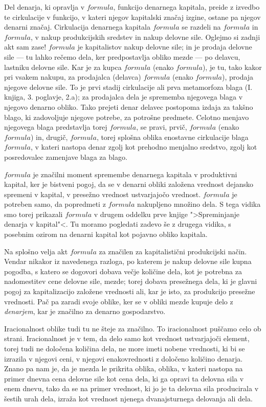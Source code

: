 \documentclass[a5paper]{scrbook}
\begin{document}
Del denarja, ki opravlja v \( formula \), funkcijo denarnega kapitala, preide z izvedbo te cirkulacije v funkcijo, v kateri njegov kapitalski značaj izgine, ostane pa njegov denarni značaj. Cirkulacija denarnega kapitala \( formula \) se razdeli na \( formula \) in \( formula \), v nakup produkcijskih sredstev in nakup delovne sile. Oglejmo si zadnji akt sam zase! \( formula \) je kapitalistov nakup delovne sile; in je prodaja delovne sile --- tu lahko rečemo dela, ker predpostavlja obliko mezde --- po delavcu, lastniku delovne sile. Kar je za kupca \( formula \) (enako \( formula \)), je tu, tako kakor pri vsakem nakupu, za prodajalca (delavca) \( formula \) (enako \( formula \)), prodaja njegove delovne sile. To je prvi stadij cirkulacije ali prva metamorfoza blaga (I. knjiga, 3. poglavje, 2.a); za prodajalca dela je sprememba njegovega blaga v njegovo denarno obliko. Tako prejeti denar delavec postopoma izdaja za takšno blago, ki zadovoljuje njegove potrebe, za potrošne predmete. Celotno menjavo njegovega blaga predstavlja torej \( formula \), se pravi, prvič, \( formula \) (enako \( formula \)) in, drugič, \( formula \), torej splošna oblika enostavne cirkulacije blaga \( formula \), v kateri nastopa denar zgolj kot prehodno menjalno sredstvo, zgolj kot posredovalec zamenjave blaga za blago.

\( formula \) je značilni moment spremembe denarnega kapitala v produktivni kapital, ker je bistveni pogoj, da se v denarni obliki založena vrednost dejansko spremeni v kapital, v presežno vrednost ustvarjajočo vrednost. \( formula \) je potreben samo, da popredmeti z \( formula \) nakupljeno množino dela. S tega vidika smo torej prikazali \( formula \) v drugem oddelku prve knjige ">Spreminjanje denarja v kapital"<. Tu moramo pogledati zadevo še z drugega vidika, s posebnim ozirom na denarni kapital kot pojavno obliko kapitala.

Na splošno velja akt \( formula \) za značilen za kapitalistični produkcijski način. Vendar nikakor iz navedenega razloga, po katerem je nakup delovne sile kupna pogodba, s katero se dogovori dobava večje količine dela, kot je potrebna za nadomestitev cene delovne sile, mezde; torej dobava presežnega dela, ki je glavni pogoj za kapitalizacijo založene vrednosti ali, kar je isto, za produkcijo presežne vrednosti. Pač pa zaradi svoje oblike, ker se v obliki mezde kupuje delo z \emph{denarjem}, kar je značilno za denarno gospodarstvo.

Iracionalnost oblike tudi tu ne šteje za značilno. To iracionalnost puščamo celo ob strani. Iracionalnost je v tem, da delo samo kot vrednost ustvarjajoči element, torej tudi ne določena količina dela, ne more imeti nobene vrednosti, ki bi se izrazila v njegovi ceni, v njegovi enakovrednosti z določeno količino denarja. Znano pa nam je, da je mezda le prikrita oblika, oblika, v kateri nastopa na primer dnevna cena delovne sile kot cena dela, ki ga opravi ta delovna sila v enem dnevu, tako da se na primer vrednost, ki jo je ta delovna sila producirala v šestih urah dela, izraža kot vrednost njenega dvanajsturnega delovanja ali dela.
\end{document}
